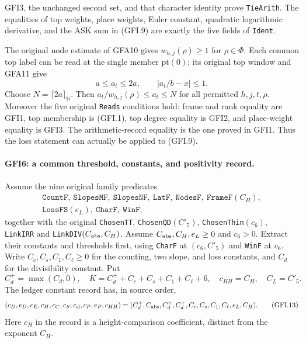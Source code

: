 GFI3, the unchanged second set, and that character identity prove
\texttt{TieArith}.  The equalities of top weights, place weights,
Euler constant, quadratic logarithmic derivative, and the ASK sum
in (GFI.9) are exactly the five fields of \texttt{Ident}.

The original node estimate of GFA10 gives $w_{h,j}(\rho)\ge1$
for $\rho\in\Phi$.  Each common top label can be read at the
single member $\mathrm{pt}(0)$; its original top window and GFA11
give
\[
 a\le a_t\le2a,\qquad |a_t/b-x|\le1.                \tag{GFI.10}
\]
Choose $N=\lceil2a\rceil_{\mathbb N}$.  Then
$a_t/w_{h,j}(\rho)\le a_t\le N$ for all permitted $h,j,t,\rho$.
Moreover the five original \texttt{Reads} conditions hold:
frame and rank equality are GFI1, top membership is (GFI.1), top
degree equality is GFI2, and place-weight equality is GFI3.
The arithmetic-record equality is the one proved in GFI1.  Thus
the loss statement can actually be applied to (GFI.9).

\paragraph{GFI6: a common threshold, constants, and positivity record.}
\label{claim:GFI6}
Assume the nine original family predicates
\[
\begin{gathered}
 \texttt{CountF},\ \texttt{SlopesMF},\ \texttt{SlopesNF},\
 \texttt{LatF},\ \texttt{NodesF},\ \texttt{FrameF}(C_H),\\
 \texttt{LossFS}(e_L),\ \texttt{CharF},\ \texttt{WinF},
\end{gathered}                                                     \tag{GFI.11}
\]
together with the original \texttt{ChosenTT},
\texttt{ChosenQD}$(C'_5)$, \texttt{ChosenThin}$(c_6)$,
\texttt{LinkIRR} and \texttt{LinkDIV}$(C_{\rm abs},C_H)$.
Assume $C_{\rm abs},C_H,e_L\ge0$ and $c_6>0$.
Extract their constants and thresholds first, using
\texttt{CharF} at $(c_6,C'_5)$ and \texttt{WinF} at $c_6$.
Write $C_c,C_s,C_1,C_\ell\ge0$ for the counting, two slope,
and loss constants, and $C_d$ for the divisibility constant.
Put
\[
 C_d^+=\max(C_d,0),\quad
 K=C_d^++C_c+C_s+C_1+C_\ell+6,\quad
 c_{HH}=C_H,\quad C_L=C'_5.                              \tag{GFI.12}
\]
The ledger constant record has, in source order,
\[
 (c_D,e_D,c_E,c_H,c_C,c_S,c_{\mathrm{sl}},c_P,e_P,c_{HH})
 =(C_d^+,C_{\rm abs},C_d^+,C_d^+,C_c,C_s,C_1,C_\ell,e_L,C_H).
                                                               \tag{GFI.13}
\]
Here $c_H$ in the record is a height-comparison coefficient,
distinct from the exponent $C_H$.

